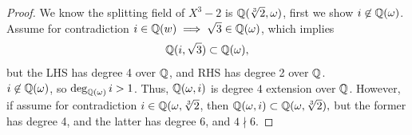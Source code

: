 \documentclass[12pt,english]{article}
\begin{document}
\begin{proof}
We know the splitting field of $X^3-2$ is $\mathbb{Q}(\sqrt[3]{2}, \omega)$, 
first we show $i \not\in \mathbb{Q}(\omega)$. 
Assume for contradiction $i \in \mathbb{Q}(w) \implies \sqrt{3} \in \mathbb{Q}(\omega)$, which implies 
\begin{align*}
    \mathbb{Q}(i,\sqrt{3}) \subset \mathbb{Q}(\omega),
\end{align*} but the LHS has degree 4 over $\mathbb{Q}$, and RHS has degree 2 over $\mathbb{Q}$. \\

$i \not\in \mathbb{Q}(\omega)$, so $\deg_{\mathbb{Q}(\omega)}i >1$. 
Thus, $\mathbb{Q}(\omega,i)$ is degree $4$ extension over $\mathbb{Q}$. 
However, if assume for contradiction $i \in \mathbb{Q}(\omega,\sqrt[3]{2}$, 
then $\mathbb{Q}(\omega,i) \subset \mathbb{Q}(\omega, \sqrt[3]{2}),$ 
but the former has degree 4, and the latter has degree 6, and $4 \nmid 6$.
\end{proof}
\end{document}
